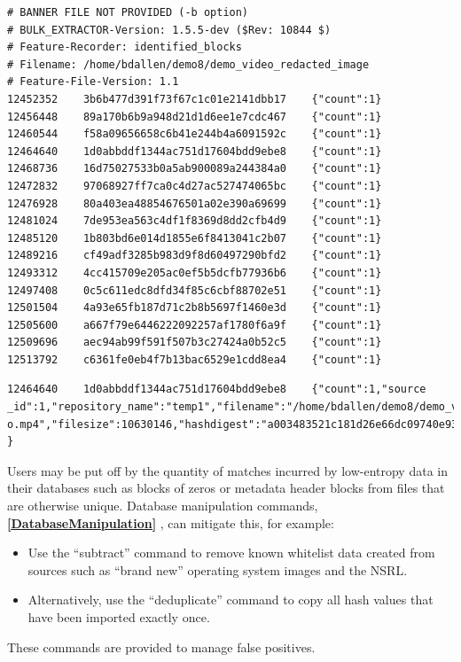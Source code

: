 \documentclass[11pt,fleqn]{article} %
\begin{document}
\lstset{style=customfile}
\begin{lstlisting}[float, caption={The \texttt{identified\_blocks.txt} file produced by \bulk's \textit{hashdb} scanner. First column is the forensic path, second is the hash value, and third is the number of times the hash value occurs in the database}, label=identifiedBlocks]
# BANNER FILE NOT PROVIDED (-b option)
# BULK_EXTRACTOR-Version: 1.5.5-dev ($Rev: 10844 $)
# Feature-Recorder: identified_blocks
# Filename: /home/bdallen/demo8/demo_video_redacted_image
# Feature-File-Version: 1.1
12452352	3b6b477d391f73f67c1c01e2141dbb17	{"count":1}
12456448	89a170b6b9a948d21d1d6ee1e7cdc467	{"count":1}
12460544	f58a09656658c6b41e244b4a6091592c	{"count":1}
12464640	1d0abbddf1344ac751d17604bdd9ebe8	{"count":1}
12468736	16d75027533b0a5ab900089a244384a0	{"count":1}
12472832	97068927ff7ca0c4d27ac527474065bc	{"count":1}
12476928	80a403ea48854676501a02e390a69699	{"count":1}
12481024	7de953ea563c4df1f8369d8dd2cfb4d9	{"count":1}
12485120	1b803bd6e014d1855e6f8413041c2b07	{"count":1}
12489216	cf49adf3285b983d9f8d60497290bfd2	{"count":1}
12493312	4cc415709e205ac0ef5b5dcfb77936b6	{"count":1}
12497408	0c5c611edc8dfd34f85c6cbf88702e51	{"count":1}
12501504	4a93e65fb187d71c2b8b5697f1460e3d	{"count":1}
12505600	a667f79e6446222092257af1780f6a9f	{"count":1}
12509696	aec94ab99f591f507b3c27424a0b52c5	{"count":1}
12513792	c6361fe0eb4f7b13bac6529e1cdd8ea4	{"count":1}
\end{lstlisting}

\begin{lstlisting}[float, caption={The \texttt{identified\_sources.txt} file produced by post-processing the \texttt{identified\_blocks.txt} file. First column is the forensic path, second is the hash value, and third is the repository name, filename, and file offset}, label=identifiedSourceLine]
12464640	1d0abbddf1344ac751d17604bdd9ebe8	{"count":1,"source
_id":1,"repository_name":"temp1","filename":"/home/bdallen/demo8/demo_vide
o.mp4","filesize":10630146,"hashdigest":"a003483521c181d26e66dc09740e939d"
}
\end{lstlisting}

Users may be put off by the quantity of matches incurred by low-entropy data in their databases such as blocks of zeros or metadata header blocks from files that are otherwise unique. Database manipulation commands,
\textbf{\autoref{DatabaseManipulation}}
, can mitigate this, for example:
\begin{itemize}
\item Use the ``subtract'' command to remove known whitelist data created from sources such as ``brand new'' operating system images and the NSRL.
\item Alternatively, use the ``deduplicate'' command to copy all hash values that have been imported exactly once.
\end{itemize}
These commands are provided to manage false positives.
\end{document}
